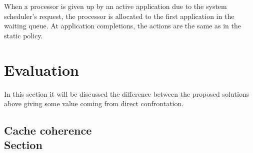 \documentclass[a4paper,10pt]{article}
\begin{document}
\begin{multicols}{2}
When a processor is given up by an active application due to the system scheduler's request, the processor is allocated to the first application in the waiting queue. At application completions, the actions are the same as in the static policy.






\section{Evaluation}

In this section it will be discussed the difference between the proposed solutions above giving some value coming from direct confrontation.

\subsection{Cache coherence \\ Section}


\end{multicols}
\end{document}
